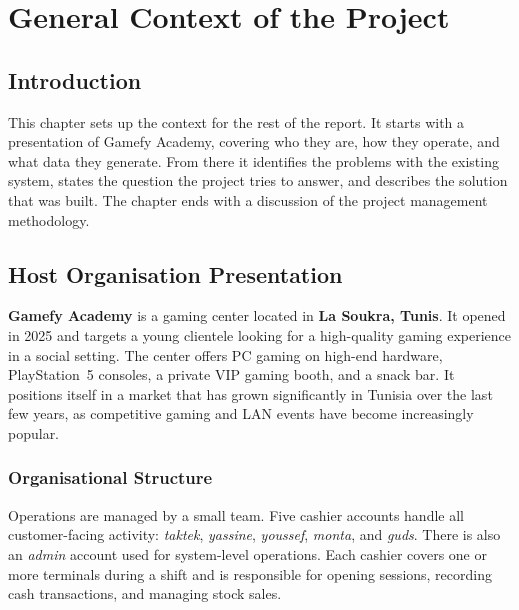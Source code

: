\documentclass[12pt, a4paper]{report}
\begin{document}
\newpage

\chapter{General Context of the Project}

\section{Introduction}

This chapter sets up the context for the rest of the report. It starts with a
presentation of Gamefy Academy, covering who they are, how they operate, and what data
they generate. From there it identifies the problems with the existing system,
states the question the project tries to answer, and describes the solution that
was built. The chapter ends with a discussion of the project management methodology.

\section{Host Organisation Presentation}

\textbf{Gamefy Academy} is a gaming center located in \textbf{La Soukra, Tunis}.
It opened in 2025 and targets a young clientele looking for a high-quality gaming
experience in a social setting. The center offers PC gaming on high-end hardware,
PlayStation~5 consoles, a private VIP gaming booth, and a snack bar. It positions
itself in a market that has grown significantly in Tunisia over the last few years,
as competitive gaming and LAN events have become increasingly popular.


\subsection{Organisational Structure}

Operations are managed by a small team. Five cashier accounts handle all
customer-facing activity: \textit{taktek}, \textit{yassine}, \textit{youssef},
\textit{monta}, and \textit{guds}. There is also an \textit{admin} account
used for system-level operations. Each cashier covers one or more terminals during
a shift and is responsible for opening sessions, recording cash transactions, and
managing stock sales.
\end{document}
